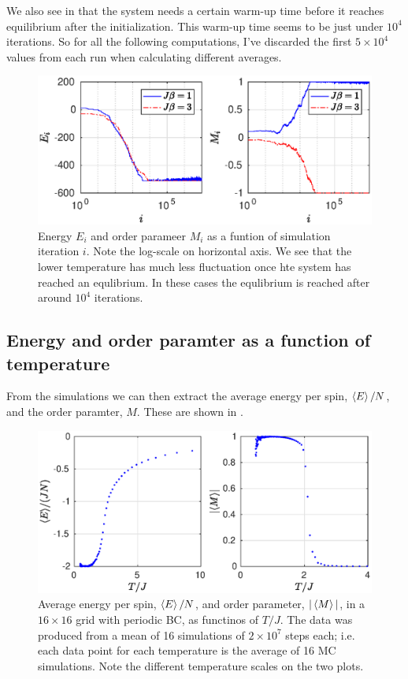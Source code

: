 \documentclass[11pt,letter, swedish, english
]{article}
\begin{document}
We also see in  that the system needs a certain
warm-up time before it reaches equilibrium after the
initialization. This warm-up time seems to be just under $10^4$
iterations. So for all the following computations, I've discarded the
first $5\times10^4$ values from each run when calculating different
averages. 



\begin{figure}
\centering
\includegraphics[width=1\textwidth]{EM_all-time-steps.eps}
\caption{Energy $E_i$ and order parameer $M_i$ as a funtion of
  simulation iteration $i$. Note the log-scale on horizontal axis. We
  see that the lower temperature has much less fluctuation once hte
  system has reached an equlibrium. In these cases the equlibrium is
  reached after around $10^4$ iterations.} 
\label{fig:EM_all}
\end{figure}


\subsection{Energy and order paramter as a function of temperature}
From the simulations we can then extract the average energy per spin,
$\ev{E}/N$, and the order paramter, $M$. These are shown in
. 

\begin{figure}
\centering
\includegraphics[width=1\textwidth]{EM_L-16_Nsteps-2048_Nmean-16.eps}
\caption{Average energy per spin, $\ev{E}/N$, and order parameter,
  $|\ev{M}|$, in a $16\times16$ grid with periodic BC, as functinos of
  $T/J$. The data was produced from a mean of 16 simulations of
  $2\times10^7$ steps each; i.e. each data point for each temperature
  is the average of 16 MC simulations. Note the different temperature
  scales on the two plots.} 
\label{fig:EM1}
\end{figure}
\end{document}

